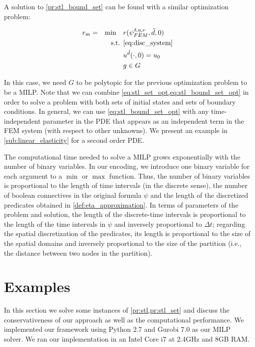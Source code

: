 \documentclass[letterpaper, 10 pt, conference]{ieeeconf/ieeeconf}
\begin{document}
A solution to \cref{pr:stl_bound_set} can be found with a similar optimization
problem:

\begin{equation}
    \label{eq:stl_bound_set_opt}
    \begin{aligned}
        &r_m = &\min \quad &r(\psi^{\delta, \eta, \nu}_{FEM}, \tilde{d}, 0) \\
        &  &\text{s.t. } &\cref{eq:disc_system} \\
        &  & &u^{\tilde{d}}(\cdot, 0) = u_0 \\
        &  & &g \in G \end{aligned}
\end{equation}

In this case, we need $G$ to be polytopic for the previous optimization problem
to be a MILP. Note that we can combine \cref{eq:stl_set_opt,eq:stl_bound_set_opt} in order to
solve a problem with both sets of initial states and sets of boundary
conditions. In general, we can use \cref{eq:stl_bound_set_opt} with any time-independent 
parameter in the PDE that appears
as an independent term in the FEM system (with respect to other unknowns). We
present an example in \cref{sub:linear_elasticity} for a second order PDE.

The computational time needed to solve a MILP grows exponentially with 
the number of binary variables. In our encoding, we introduce one
binary variable for each argument to a $\min$ or $\max$ function. Thus, the
number of binary variables is proportional to the length of time intervals (in
the discrete sense), the number of boolean connectives in the original formula
$\psi$ and the length of the discretized predicates obtained in
\cref{def:eta_approximation}. In terms of parameters of the problem and solution,
the length of the discrete-time intervals is proportional to the length of the time
intervals in $\psi$ and inversely proportional to $\Delta t$; regarding the
spatial discretization of the predicates, its length is proportional to the size
of the spatial domains and inversely proportional to the size of the partition
(i.e., the distance between two nodes in the partition).

\section{Examples}
\label{sec:examples}

In this section we solve some instances of \cref{pr:stl,pr:stl_set} and discuss
the conservativeness of our approach as well as the computational performance.
We implemented our framework using Python 2.7 and Gurobi 7.0 as our MILP solver.
We ran our implementation in an Intel Core i7 at 2.4GHz and 8GB RAM.
\end{document}
